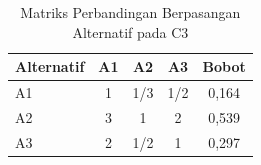 \begin{table}[h]
\centering
\caption{Matriks Perbandingan Berpasangan Alternatif pada C3}
\label{tab:ahp-alt-c3}
\begin{tabular}{|l|c|c|c|c|}
\hline
\textbf{Alternatif} & \textbf{A1} & \textbf{A2} & \textbf{A3} & \textbf{Bobot} \\
\hline
A1             & 1     & 1/3   & 1/2   & 0,164 \\
A2             & 3     & 1     & 2     & 0,539 \\
A3             & 2     & 1/2   & 1     & 0,297 \\
\hline
\end{tabular}
\end{table}